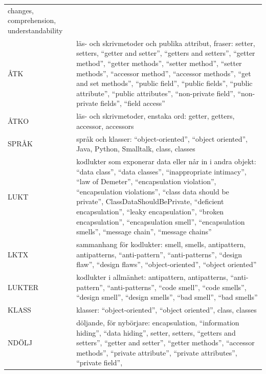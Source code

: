 \begin{longtable}{@{}>{\raggedright\arraybackslash}p{}%
  >{\raggedright\arraybackslash}p{}@{}}
    changes, comprehension, understandability \\
  ÅTK & läs- och skrivmetoder och publika attribut, fraser: setter,
    setters, \enquote{getter and setter}, \enquote{getters and setters},
    \enquote{getter method}, \enquote{getter methods}, \enquote{setter
    method}, \enquote{setter methods}, \enquote{accessor method},
    \enquote{accessor methods}, \enquote{get and set methods},
    \enquote{public field}, \enquote{public fields}, \enquote{public
    attribute}, \enquote{public attributes}, \enquote{non-private field},
    \enquote{non-private fields}, \enquote{field access} \\
  ÅTKO & läs- och skrivmetoder, enstaka ord: getter, getters, accessor,
    accessors \\
  SPRÅK & språk och klasser: \enquote{object-oriented}, \enquote{object
    oriented}, Java, Python, Smalltalk, class, classes \\
  LUKT & kodlukter som exponerar data eller når in i andra objekt:
    \enquote{data class}, \enquote{data classes}, \enquote{inappropriate
    intimacy}, \enquote{law of Demeter}, \enquote{encapsulation
    violation}, \enquote{encapsulation violations}, \enquote{class data
    should be private}, ClassData\-Should\-Be\-Private, \enquote{deficient
    encapsulation}, \enquote{leaky encapsulation}, \enquote{broken
    encapsulation}, \enquote{encapsulation smell}, \enquote{encapsulation
    smells}, \enquote{message chain}, \enquote{message chains} \\
  LKTX & sammanhang för kodlukter: smell, smells, antipattern,
    antipatterns, \enquote{anti-pattern}, \enquote{anti-patterns},
    \enquote{design flaw}, \enquote{design flaws},
    \enquote{object-oriented}, \enquote{object oriented} \\
  LUKTER & kodlukter i allmänhet: antipattern, antipatterns,
    \enquote{anti-pattern}, \enquote{anti-patterns}, \enquote{code smell},
    \enquote{code smells}, \enquote{design smell}, \enquote{design
    smells}, \enquote{bad smell}, \enquote{bad smells} \\
  KLASS & klasser: \enquote{object-oriented}, \enquote{object oriented},
    class, classes \\
  NDÖLJ & döljande, för nybörjare: encapsulation, \enquote{information
    hiding}, \enquote{data hiding}, setter, setters, \enquote{getters and
    setters}, \enquote{getter and setter}, \enquote{getter methods},
    \enquote{accessor methods}, \enquote{private attribute},
    \enquote{private attributes}, \enquote{private field},

\end{longtable}
